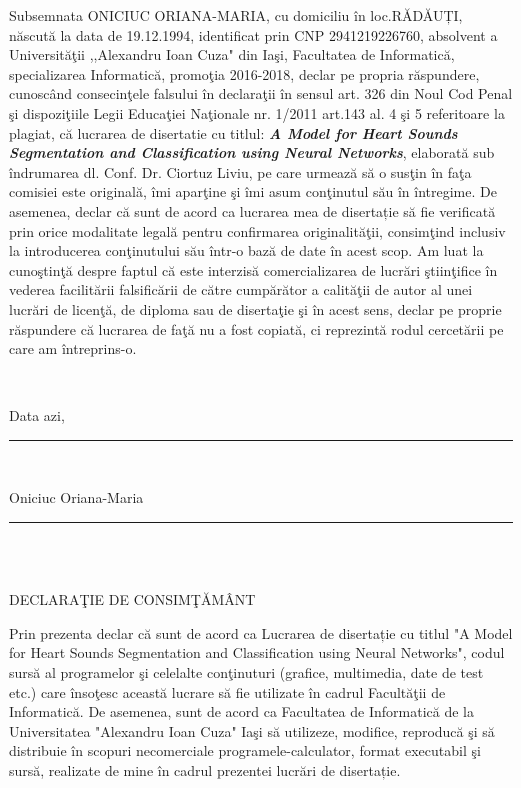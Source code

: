 \documentclass[11pt, a4papper]{report}
\theoremstyle{plain}
\theoremstyle{definition}
\theoremstyle{definition}
\theoremstyle{proposition}
\begin{document}
Subsemnata ONICIUC ORIANA-MARIA, cu domiciliu \^in loc.RĂDĂUȚI, n\u ascută la data de 19.12.1994, identificat prin CNP 2941219226760, absolvent a Universit\u a\c tii ,,Alexandru Ioan Cuza" din Ia\c si, Facultatea de Informatic\u a, specializarea Informatic\u a, promo\c tia 2016-2018, declar pe propria r\u aspundere, cunosc\^and consecin\c tele falsului \^in declara\c tii \^in sensul art. 326 din Noul Cod Penal \c si dispozi\c tiile Legii Educa\c tiei Na\c tionale nr. 1/2011 art.143 al. 4 \c si 5 referitoare la plagiat, c\u a lucrarea de disertatie cu titlul: \textbf{\textit{A Model for Heart Sounds Segmentation and Classification using Neural Networks}}, elaborat\u a sub \^indrumarea dl. Conf. Dr. Ciortuz Liviu, pe care urmeaz\u a s\u a o sus\c tin \^in fa\c ta comisiei este original\u a, \^imi apar\c tine \c si \^imi asum con\c tinutul s\u au \^in \^intregime. De asemenea, declar c\u a sunt de acord ca lucrarea mea de disertație s\u a fie verificat\u a prin orice modalitate legal\u a pentru confirmarea originalit\u a\c tii, consim\c tind inclusiv la introducerea con\c tinutului s\u au \^intr-o baz\u a de date \^in acest scop. Am luat la cuno\c stin\c t\u a despre faptul c\u a este interzis\u a comercializarea de lucr\u ari \c stiin\c tifice \^in vederea facilit\u arii falsific\u arii de c\u atre cump\u ar\u ator a calit\u a\c tii de autor al unei lucr\u ari de licen\c t\u a, de diploma sau de diserta\c tie \c si \^in acest sens, declar pe proprie r\u aspundere c\u a lucrarea de fa\c t\u a nu a fost copiat\u a, ci reprezint\u a rodul cercet\u arii pe care am \^intreprins-o.

\bigskip
\

\noindent Data azi,

\noindent \rule{3.5cm}{0.4pt}
\


\begin{flushright}
  Oniciuc Oriana-Maria
  
  \rule{3.5cm}{0.4pt}
\end{flushright}

\newpage
\
\\
\


\begin{center}
DECLARA\c TIE DE CONSIM\c T\u AMÂNT
\end{center}

\bigskip

\indent
\par Prin prezenta declar c\u a sunt de acord ca Lucrarea de disertație cu titlul "A Model for Heart Sounds Segmentation and Classification using Neural Networks", codul surs\u a al programelor \c si celelalte con\c tinuturi (grafice, multimedia, date de test
etc.) care înso\c tesc aceast\u a lucrare s\u a fie utilizate în cadrul Facult\u a\c tii de Informatic\u a.
De asemenea, sunt de acord ca Facultatea de Informatic\u a de la Universitatea "Alexandru Ioan
Cuza" Ia\c si s\u a utilizeze, modifice, reproduc\u a \c si s\u a distribuie în scopuri necomerciale
programele-calculator, format executabil \c si surs\u a, realizate de mine în cadrul prezentei
lucr\u ari de disertație.
\\
\end{document}
